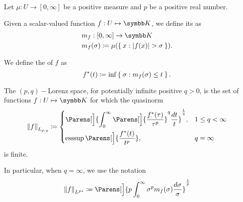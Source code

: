 \begin{definition}\label{def:distribution_function}\cite[6]{Bergh1976}
  Let \( \mu: U \to [0, \infty] \) be a positive measure and \( p \) be a positive real number.

  \begin{DefEnum}
     Given a scalar-valued function \( f: U \mapsto \BK \), we define its  as
    \begin{align*}
      &m_f: [0, \infty] \to \BK \\
      &m_f(\sigma) \coloneqq \mu(\Set{ x : \Abs{f(x)} > \sigma }).
    \end{align*}

     We define the  of \( f \) as
    \begin{equation*}
      f^*(t) \coloneqq \inf\Set{ \sigma : m_f(\sigma) \leq t }.
    \end{equation*}

     The \( (p, q)-\)Lorenz space, for potentially infinite positive \( q > 0 \), is the set of functions \( f: U \mapsto \BK \) for which the quasinorm
    \begin{equation*}
      \Norm{f}_{L_{p,q}} \coloneqq \begin{dcases}
        \Parens[\Big]{\int_0^\infty \Parens[\Big]{\frac {f^*(\tau)} {\tau^p}}^q \frac {d t} t}^{\frac 1 q}, &1 \leq q < \infty \\
        \Ess\sup\Parens[\Big]{\frac {f^*(t)} {t^p}}, &q = \infty
      \end{dcases}
    \end{equation*}
    is finite.

    In particular, when \( q = \infty \), we use the notation
    \begin{equation*}
      \Norm{f}_{L^{p*}} \coloneqq \Parens[\Big]{p \int_0^\infty \sigma^p m_f(\sigma) \frac {d \sigma} \sigma}^{\frac 1 p}
    \end{equation*}
  \end{DefEnum}
\end{definition}

